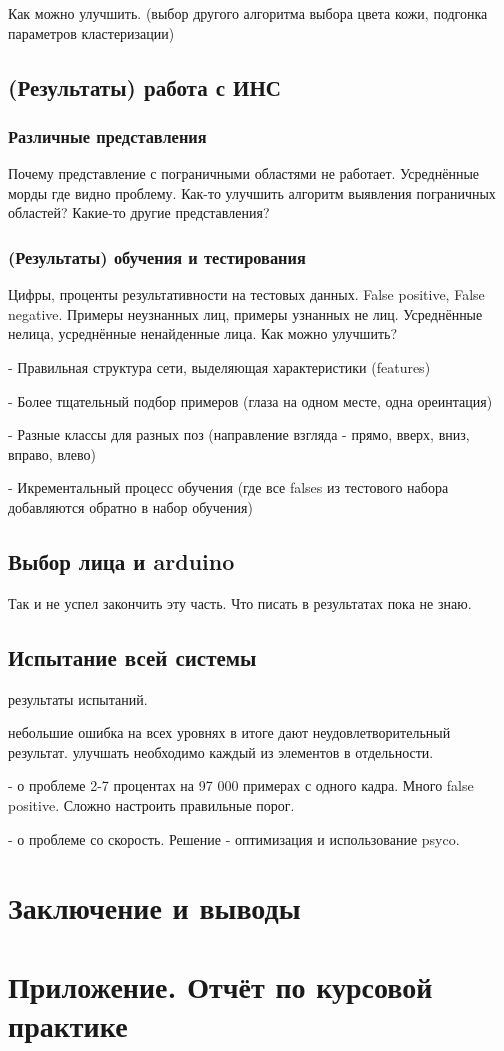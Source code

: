 \documentclass[12pt]{report}
\begin{document}
Как можно улучшить. (выбор другого алгоритма выбора цвета кожи, подгонка параметров кластеризации)
\section{(Результаты) работа с ИНС}
\subsection{Различные представления}
Почему представление с пограничными областями не работает. Усреднённые морды где видно проблему. Как-то улучшить алгоритм выявления пограничных областей? Какие-то другие представления?
\subsection{(Результаты) обучения и тестирования}
Цифры, проценты результативности на тестовых данных. False positive, False negative. Примеры неузнанных лиц, примеры узнанных не лиц. Усреднённые нелица, усреднённые ненайденные лица.
Как можно улучшить?

- Правильная структура сети, выделяющая характеристики (features)

- Более тщательный подбор примеров (глаза на одном месте, одна ореинтация)

- Разные классы для разных поз (направление взгляда - прямо, вверх, вниз, вправо, влево)

- Икрементальный процесс обучения (где все falses из тестового набора добавляются обратно в набор обучения)
\section{Выбор лица и arduino}
Так и не успел закончить эту часть. Что писать в результатах пока не знаю.
\section{Испытание всей системы}
результаты испытаний.

небольшие ошибка на всех уровнях в итоге дают неудовлетворительный результат. улучшать необходимо каждый из элементов в отдельности.

- о проблеме 2-7 процентах на 97 000 примерах с одного кадра. Много false positive. Сложно настроить правильные порог.

- о проблеме со скорость. Решение - оптимизация и использование psyco.

\chapter*{Заключение и выводы}
\thispagestyle{fancy}


\appendix
\chapter{Приложение. Отчёт по курсовой практике}









\end{document}
